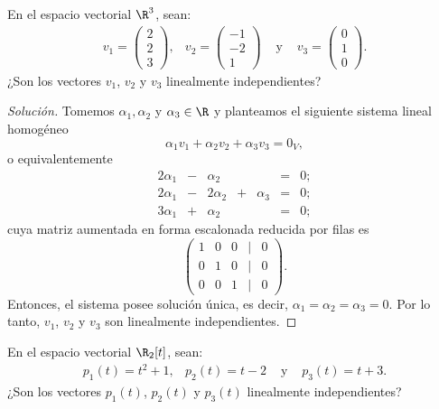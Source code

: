 \documentclass[a4,11pt]{aleph-notas}
\begin{document}
\begin{ejer}
    En el espacio vectorial $\R^{3}$, sean:
    \[
        \begin{array}{cccc}
            v_1 = \begin{pmatrix} 2\\ 2\\ 3 \end{pmatrix}, &
        v_2 = \begin{pmatrix} -1\\ -2\\ 1 \end{pmatrix} &
        \text{ y } &
        v_3 = \begin{pmatrix} 0\\ 1\\ 0 \end{pmatrix}.
        \end{array}
    \]
    ¿Son los vectores $v_1$, $v_2$ y $v_3$ linealmente independientes?
\end{ejer}

\begin{proof}[Solución]\hspace{0pt}
    Tomemos $\alpha_1, \alpha_2$ y $\alpha_3\in\R$ y planteamos el siguiente sistema lineal homogéneo
    \[
        \alpha_1 v_1 + \alpha_2 v_2 + \alpha_3 v_3 = 0_V,
    \]
    o equivalentemente
    \[
        \begin{array}{ccccccc}
            2\alpha_1 & - & \alpha_2 &  & & = & 0;\\
            2\alpha_1 & - & 2\alpha_2 & + & \alpha_3& = & 0;\\
            3\alpha_1 & + & \alpha_2 &  & & = & 0;
        \end{array}
    \]
    cuya matriz aumentada en forma escalonada reducida por filas es
    \[
        \begin{pmatrix}
            1 & 0 & 0 & | & 0\\
            0 & 1 & 0 & | & 0\\
            0 & 0 & 1 & | & 0
        \end{pmatrix}.
    \]
    Entonces, el sistema posee solución única, es decir, $\alpha_1 = \alpha_2 = \alpha_3 = 0$. Por lo tanto, $v_1$, $v_2$ y $v_3$ son linealmente independientes.
\end{proof}

\begin{ejer}
    En el espacio vectorial $\R_2[t]$, sean:
    \[
        \begin{array}{cccc}
            p_1(t) = t^2 + 1, & 
            p_2(t) = t - 2 &
            \text{ y } &
            p_3(t) = t + 3.
        \end{array}
    \]
    ¿Son los vectores $p_1(t)$, $p_2(t)$ y $p_3(t)$ linealmente independientes?
\end{ejer}
\end{document}
